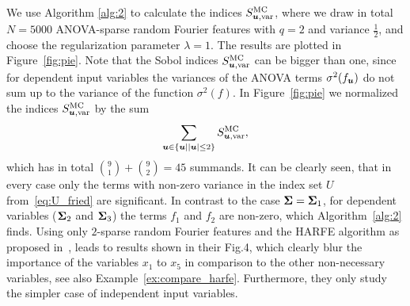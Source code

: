 \documentclass{article}
\renewcommand{\vec}[1]{\ensuremath \mathbf{\boldsymbol{#1}}}
\theoremstyle{definition}
\numberwithin{equation}{section}
\begin{document}
We use Algorithm \ref{alg:2} to calculate the indices $S^{\text{MC}}_{\vec u,\text{var}}$, where we draw in total $N = 5000$ ANOVA-sparse random Fourier features with $q=2$ and variance $\frac 12$, and choose the regularization parameter $\lambda =1$. The results are plotted in Figure~\ref{fig:pie}.   
Note that the Sobol indices $S^{\text{MC}}_{\vec u,\text{var}}$ can be bigger than one, since for dependent input variables the variances of the ANOVA terms $\sigma^2(f_{\vec u})$ do not sum up to the variance of the function $\sigma^2(f)$. In Figure~\ref{fig:pie} we normalized the indices $S^{\text{MC}}_{\vec u,\text{var}}$ by the sum 
$$\sum_{\vec u \in \{\vec u\mid |\vec u|\leq 2\}} S^{\text{MC}}_{\vec u,\text{var}},$$
which has in total $\binom{9}{1} + \binom{9}{2} = 45 $ summands. It can be clearly seen, that in every case only the terms with non-zero variance in the index set $U$ from~\eqref{eq:U_fried} are significant. In contrast to the case $\vec \Sigma = \vec \Sigma_1$, for dependent variables ($\vec \Sigma_2$ and $\vec \Sigma_3$) the terms $f_1$ and $f_2$ are non-zero, which Algorithm~\ref{alg:2} finds. Using only $2$-sparse random Fourier features and the HARFE algorithm as proposed in~\cite{HARFE23}, leads to results shown in their Fig.4, which clearly blur the importance of the variables $x_1$ to $x_5$ in comparison to the other non-necessary variables, see also Example~\ref{ex:compare_harfe}. Furthermore, they only study the simpler case of independent input variables. 
\end{document}
